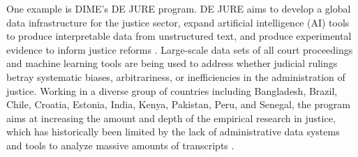 One example is DIME's DE JURE program. DE JURE aims to develop a global data infrastructure for the justice sector, expand artificial intelligence (AI) tools to produce interpretable data from unstructured text, and produce experimental evidence to inform justice reforms \citep{ash2018}. Large-scale data sets of all court proceedings and machine learning tools are being used to address whether judicial rulings betray systematic biases, arbitrariness, or inefficiencies in the administration of justice\emph{.} Working in a diverse group of countries including Bangladesh, Brazil, Chile, Croatia, Estonia, India, Kenya, Pakistan, Peru, and Senegal, the program aims at increasing the amount and depth of the empirical research in justice, which has historically been limited by the lack of administrative data systems and tools to analyze massive amounts of transcripts \citep[see][]{kondylis2019}.

